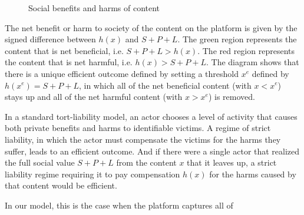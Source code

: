 \begin{figure}[h]
	\centering
{}
	\caption{Social benefits and harms of content}
	\label{fig:removal}
\end{figure}


The net benefit or harm to society of the content on the platform is given by the signed difference between $h(x)$ and $S+P+L$. The green region represents the content that is net beneficial, i.e. $S+P+L > h(x)$. The red region represents the content that is net harmful, i.e. $h(x) > S+P+L$. The diagram shows that there is a unique efficient outcome defined by setting a threshold $x^e$ defined by $h(x^e) = S + P + L$, in which all of the net beneficial content (with $x < x^e$) stays up and all of the net harmful content (with $x > x^e$) is removed.

In a standard tort-liability model, an actor chooses a level of activity that causes both private benefits and harms to identifiable victims. A regime of strict liability, in which the actor must compensate the victims for the harms they suffer, leads to an efficient outcome. And if there were a single actor that realized the full social value $S + P +L$ from the content $x$ that it leaves up, a strict liability regime requiring it to pay compensation $h(x)$ for the harms caused by that content would be efficient. 

In our model, this is the case when the platform captures all of 






